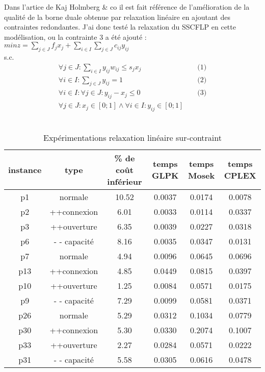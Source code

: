 \documentclass[12pt,a4paper]{article}
\begin{document}
Dans l'artice de Kaj Holmberg \& co il est fait référence de l’amélioration de la qualité de la borne duale obtenue par relaxation linéaire en ajoutant des contraintes redondantes.
J'ai donc testé la relaxation du SSCFLP en cette modélisation, ou la contrainte 3 a été ajouté :\\
$min z = \sum \limits_{j \in J} f_j x_j + \sum \limits_{i \in I} \sum \limits_{j \in J} c_{ij} y_{ij}$\\
s.c.
\begin{align*}
 \forall j \in J : \sum \limits_{i \in I} y_{ij} w_{ij} \leqslant s_j x_j & & \text{ (1)} \\
 \forall i \in I : \sum \limits_{j \in J} y_{ij} = 1 & & \text{ (2)} \\
 \forall i \in I : \forall j \in J : y_{ij} - x_{j} \leqslant 0 & & \text{ (3)} \\
 \forall j \in J : x_j \in \left[ 0;1 \right] \land \forall i \in I : y_{ij} \in \left[ 0;1 \right]
\end{align*}
~\\
\begin{table}[!h]
\centering
\begin{tabular}{|c|c|c|c|c|c|}
  \hline
  instance & type & \% de coût inférieur & temps GLPK & temps Mosek & temps CPLEX \\
  \hline
	p1 & normale & 10.52 & 0.0037 & 0.0174 & 0.0078 \\
	p2 & ++connexion & 6.01 & 0.0033 & 0.0114 & 0.0337 \\
	p3 & ++ouverture &  6.35 & 0.0039 & 0.0227 & 0.0318 \\
	p6 & - - capacité & 8.16 & 0.0035 & 0.0347 & 0.0131 \\
  \hline
	p7 & normale & 4.94 & 0.0096 & 0.0645 & 0.0696 \\
	p13 & ++connexion & 4.85 & 0.0449 & 0.0815 & 0.0397 \\
	p10 & ++ouverture & 1.25 & 0.0084 & 0.0571 & 0.0175 \\
	p9 & - - capacité & 7.29 & 0.0099 & 0.0581 & 0.0371 \\
  \hline	
	p26 & normale & 5.29 & 0.0312 & 0.1034 & 0.0779 \\
	p30 & ++connexion & 5.30 & 0.0330 & 0.2074 & 0.1007 \\
	p33 & ++ouverture & 2.27 & 0.0284 & 0.0571 & 0.0222 \\
	p31 & - - capacité & 5.58 & 0.0305 & 0.0616 & 0.0478 \\
  \hline
\end{tabular}
\caption{Expérimentations relaxation linéaire sur-contraint}
\label{surcontraint}
\end{table}
\end{document}
